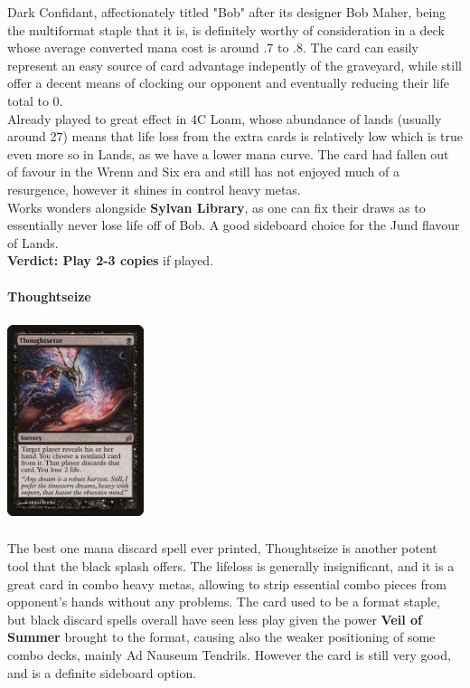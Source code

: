 \documentclass{report}
\begin{document}
Dark Confidant, affectionately titled "Bob" after its designer Bob Maher, being the multiformat staple that it is, is definitely worthy of consideration in a deck whose average converted mana cost is around .7 to .8. The card can easily represent an easy source of card advantage indepently of the graveyard, while still offer a decent means of clocking our opponent and eventually reducing their life total to 0.\\ Already played to great effect in 4C Loam, whose abundance of lands (usually around 27) means that life loss from the extra cards is relatively low which is true even more so in Lands, as we have a lower mana curve. The card had fallen out of favour in the Wrenn and Six era and still has not enjoyed much of a resurgence, however it shines in control heavy metas.\\ Works wonders alongside \textbf{Sylvan Library}, as one can fix their draws as to essentially never lose life off of Bob. A good sideboard choice for the Jund flavour of Lands.\\
\textbf{Verdict: Play 2-3 copies} if played.\\\\
\newpage
\textbf{Thoughtseize\\}
\begin{center}
\includegraphics [width = 4cm, height = 6cm] {thoughtseize}
\end{center}
The best one mana discard spell ever printed, Thoughtseize is another potent tool that the black splash offers. The lifeloss is generally insignificant, and it is a great card in combo heavy metas, allowing to strip essential combo pieces from opponent's hands without any problems.
The card used to be a format staple, but black discard spells overall have seen less play given the power \textbf{Veil of Summer} brought to the format, causing also the weaker positioning of some combo decks, mainly Ad Nauseum Tendrils. However the card is still very good, and is a definite sideboard option.\\
\end{document}
